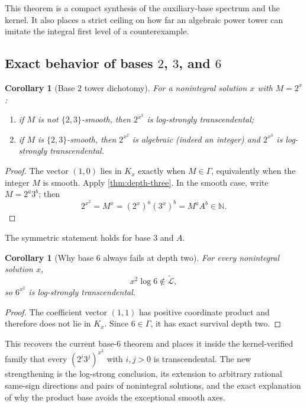 \documentclass[11pt,oneside]{article}
\newtheorem{corollary}[theorem]{Corollary}
\theoremstyle{definition}
\theoremstyle{remark}
\newcommand{\N}{\mathbb N}
\newcommand{\LL}{\widetilde{\mathcal L}}
\begin{document}
This theorem is a compact synthesis of the auxiliary-base spectrum and the kernel.  It also
places a strict ceiling on how far an algebraic power tower can imitate the integral first
level of a counterexample.

\subsection{Exact behavior of bases \texorpdfstring{$2$, $3$, and $6$}{2, 3, and 6}}

\begin{corollary}[Base $2$ tower dichotomy]\label{cor:base2-tower}
For a nonintegral solution $x$ with $M=2^x$:
\begin{enumerate}
\item if $M$ is not $\{2,3\}$-smooth, then $2^{x^2}$ is log-strongly transcendental;
\item if $M$ is $\{2,3\}$-smooth, then $2^{x^2}$ is algebraic (indeed an integer) and
      $2^{x^3}$ is log-strongly transcendental.
\end{enumerate}
\end{corollary}

\begin{proof}
The vector $(1,0)$ lies in $K_x$ exactly when $M\in\Gamma$, equivalently when the integer $M$
is smooth.  Apply \cref{thm:depth-three}.  In the smooth case, write
$M=2^a3^b$; then
\[
  2^{x^2}=M^x=(2^x)^a(3^x)^b=M^aA^b\in\N.
\]
\end{proof}

The symmetric statement holds for base $3$ and $A$.

\begin{corollary}[Why base $6$ always fails at depth two]
For every nonintegral solution $x$,
\[
  x^2\log6\notin\LL,
\]
so $6^{x^2}$ is log-strongly transcendental.
\end{corollary}

\begin{proof}
The coefficient vector $(1,1)$ has positive coordinate product and therefore does not lie in
$K_x$.  Since $6\in\Gamma$, it has exact survival depth two.
\end{proof}

This recovers the current base-$6$ theorem and places it inside the kernel-verified family
that every $(2^i3^j)^{x^2}$ with $i,j>0$ is transcendental.  The new strengthening is the
log-strong conclusion, its extension to arbitrary rational same-sign directions and pairs of
nonintegral solutions, and the exact explanation of why the product base avoids the
exceptional smooth axes.
\end{document}
